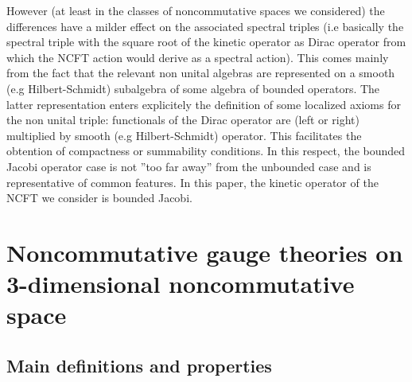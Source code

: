 \documentclass[10pt]{book}
\theoremstyle{break}
\begin{document}
However (at least in the classes of noncommutative spaces we considered) the differences have a milder effect on the associated spectral triples (i.e basically the spectral triple with the square root of the kinetic operator as Dirac operator from which the NCFT action would derive as a spectral action). This comes mainly from the fact that the relevant non unital algebras are represented on a smooth (e.g Hilbert-Schmidt) subalgebra of some algebra of bounded operators. The latter representation enters explicitely the definition of some localized axioms for the non unital triple: functionals of the Dirac operator are (left or right) multiplied by smooth (e.g Hilbert-Schmidt) operator. This facilitates the obtention of compactness or summability conditions. In this respect, the bounded Jacobi operator case is not ''too far away'' from the unbounded case and is representative of common features. In this paper, the kinetic operator of the NCFT we consider is bounded Jacobi.\par


\chapter{Noncommutative gauge theories on 3-dimensional noncommutative space}


\section{Main definitions and properties}
\end{document}
